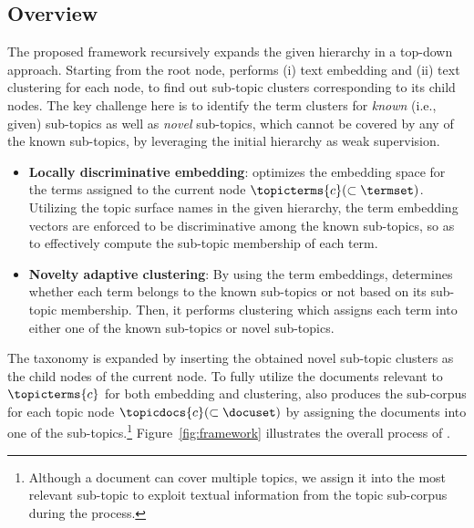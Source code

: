 \subsection{Overview}
\label{subsec:overview}
The proposed \proposed framework recursively expands the given hierarchy in a top-down approach.
Starting from the root node, \proposed performs (i) text embedding and (ii) text clustering for each node, to find out sub-topic clusters corresponding to its child nodes.
The key challenge here is to identify the term clusters for \textit{known} (i.e., given) sub-topics as well as \textit{novel} sub-topics, which cannot be covered by any of the known sub-topics, by leveraging the initial hierarchy as weak supervision.
\begin{itemize}
    \item \textbf{Locally discriminative embedding}: 
    \proposed optimizes the embedding space for the terms assigned to the current node $\topicterms{c} (\subset \termset)$.
    Utilizing the topic surface names in the given hierarchy, the term embedding vectors are enforced to be discriminative among the known sub-topics, 
    so as to effectively compute the sub-topic membership of each term.
    
    \item \textbf{Novelty adaptive clustering}: 
    By using the term embeddings, 
    \proposed determines whether each term belongs to the known sub-topics or not based on its sub-topic membership.
    Then, it performs clustering which assigns each term into either one of the known sub-topics or novel sub-topics.
\end{itemize}
The taxonomy is expanded by inserting the obtained novel sub-topic clusters as the child nodes of the current node.
To fully utilize the documents relevant to $\topicterms{c}$ for both embedding and clustering, \proposed also produces the sub-corpus for each topic node $\topicdocs{c}(\subset\docuset)$ by assigning the documents into one of the sub-topics.\footnote{Although a document can cover multiple topics, we assign it into the most relevant sub-topic to exploit textual information from the topic sub-corpus during the process.}
Figure~\ref{fig:framework} illustrates the overall process of \proposed.

